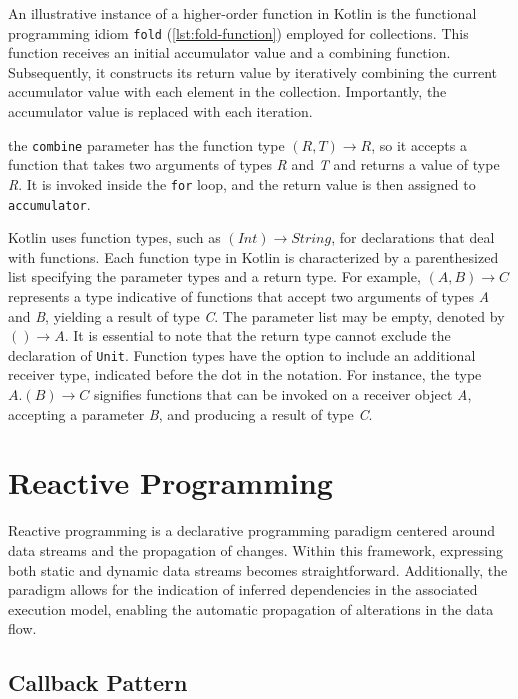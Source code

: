 \documentclass[12pt,a4paper,openright,twoside]{book}
\begin{document}
An illustrative instance of a higher-order function in Kotlin is the functional programming idiom \texttt{fold} (\cref{lst:fold-function})
employed for collections. This function receives an initial accumulator value and a combining function. Subsequently, it constructs its return value by iteratively combining the current accumulator value with each element in the collection. Importantly, the accumulator value is replaced with each iteration.



the \texttt{combine} parameter has the function type \((R, T) \rightarrow R\), so it accepts a function that takes two arguments of types \textit{R} and \textit{T} and returns a value of type \textit{R}. It is invoked inside the \texttt{for} loop, and the return value is then assigned to \texttt{accumulator}.

Kotlin uses function types, such as \((Int) \rightarrow String\), for declarations that deal with functions. Each function type in Kotlin is characterized by a parenthesized list specifying the parameter types and a return type. For example, \((A, B) \rightarrow C\) represents a type indicative of functions that accept two arguments of types \textit{A} and \textit{B}, yielding a result of type \textit{C}. The parameter list may be empty, denoted by \(() \rightarrow A\). It is essential to note that the return type cannot exclude the declaration of \texttt{Unit}. Function types have the option to include an additional receiver type, indicated before the dot in the notation. For instance, the type \(A.(B) \rightarrow C\) signifies functions that can be invoked on a receiver object \textit{A}, accepting a parameter \textit{B}, and producing a result of type \textit{C}.

\section{Reactive Programming}

Reactive programming is a declarative programming paradigm centered around data streams and the propagation of changes. Within this framework, expressing both static and dynamic data streams becomes straightforward. Additionally, the paradigm allows for the indication of inferred dependencies in the associated execution model, enabling the automatic propagation of alterations in the data flow.

\subsection{Callback Pattern}
\end{document}
